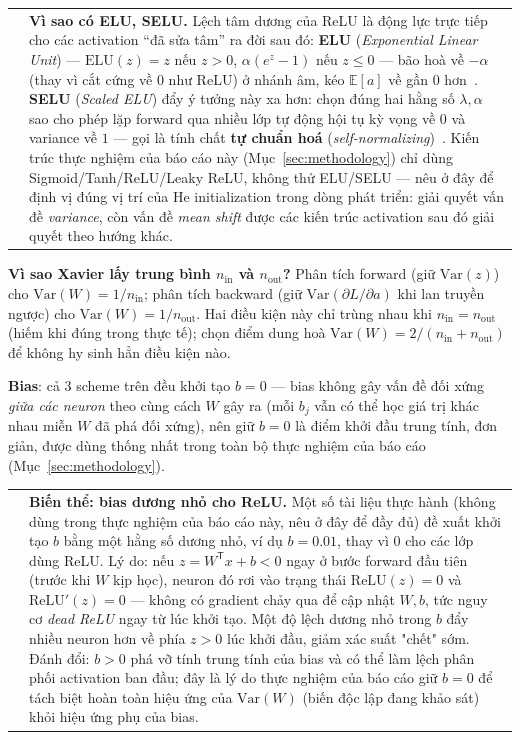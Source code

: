 \documentclass[12pt,a4paper]{article}
\makeatletter
\newenvironment{tructiep}[1][Cách hiểu đơn giản]
  {\par\smallskip\noindent\begin{tabular}{@{}p{0.35em}@{\hspace{6pt}}p{\dimexpr\linewidth-1.9em\relax}@{}}
   \textcolor{boxln}{\rule{2pt}{\baselineskip}} & \textbf{#1.}\enspace\ignorespaces}
  {\end{tabular}\par\smallskip}
\newcommand{\en}[1]{\textit{#1}}
\newcommand{\T}{^{\mathsf{T}}}
\makeatother
\begin{document}
\begin{tructiep}[Vì sao có ELU, SELU]
Lệch tâm dương của ReLU là động lực trực tiếp cho các activation ``đã sửa
tâm'' ra đời sau đó: \textbf{ELU} (\en{Exponential Linear Unit})
--- $\mathrm{ELU}(z)=z$ nếu $z>0$, $\alpha(e^z-1)$ nếu $z\le0$
--- bão hoà về $-\alpha$ (thay vì cắt cứng về $0$ như ReLU) ở nhánh âm,
kéo $\mathbb E[a]$ về gần $0$ hơn~\citep{clevert2016elu}. \textbf{SELU}
(\en{Scaled ELU}) đẩy ý tưởng này xa hơn: chọn đúng hai hằng số
$\lambda,\alpha$ sao cho phép lặp forward qua nhiều lớp tự động hội tụ
kỳ vọng về $0$ và variance về $1$ --- gọi là tính chất
\textbf{tự chuẩn hoá} (\en{self-normalizing})~\citep{klambauer2017selu}.
Kiến trúc thực nghiệm của báo cáo này (Mục~\ref{sec:methodology}) chỉ
dùng Sigmoid/Tanh/ReLU/Leaky ReLU, không thử ELU/SELU --- nêu ở đây để
định vị đúng vị trí của He initialization trong dòng phát triển: giải
quyết vấn đề \emph{variance}, còn vấn đề \emph{mean shift} được các kiến
trúc activation sau đó giải quyết theo hướng khác.
\end{tructiep}

\textbf{Vì sao Xavier lấy trung bình $n_{\text{in}}$ và $n_{\text{out}}$?}
Phân tích forward (giữ $\mathrm{Var}(z)$) cho $\mathrm{Var}(W)=1/n_{\text{in}}$;
phân tích backward (giữ $\mathrm{Var}(\partial L/\partial a)$ khi lan
truyền ngược) cho $\mathrm{Var}(W)=1/n_{\text{out}}$. Hai điều kiện này chỉ
trùng nhau khi $n_{\text{in}}=n_{\text{out}}$ (hiếm khi đúng trong thực
tế); \citet{glorot2010understanding} chọn điểm dung hoà
$\mathrm{Var}(W)=2/(n_{\text{in}}+n_{\text{out}})$ để không hy sinh hẳn
điều kiện nào.

\textbf{Bias}: cả 3 scheme trên đều khởi tạo $b=0$ --- bias không gây vấn
đề đối xứng \emph{giữa các neuron} theo cùng cách $W$ gây ra (mỗi $b_j$
vẫn có thể học giá trị khác nhau miễn $W$ đã phá đối xứng), nên giữ $b=0$
là điểm khởi đầu trung tính, đơn giản, được dùng thống nhất trong toàn bộ
thực nghiệm của báo cáo (Mục~\ref{sec:methodology}).

\begin{tructiep}[Biến thể: bias dương nhỏ cho ReLU]
Một số tài liệu thực hành (không dùng trong thực nghiệm của báo cáo này,
nêu ở đây để đầy đủ) đề xuất khởi tạo $b$ bằng một hằng số dương nhỏ, ví
dụ $b=0.01$, thay vì $0$ cho các lớp dùng ReLU. Lý do: nếu $z=W\T x+b<0$
ngay ở bước forward đầu tiên (trước khi $W$ kịp học), neuron đó rơi vào
trạng thái $\mathrm{ReLU}(z)=0$ và $\mathrm{ReLU}'(z)=0$ --- không có
gradient chảy qua để cập nhật $W,b$, tức nguy cơ \emph{dead ReLU} ngay từ
lúc khởi tạo. Một độ lệch dương nhỏ trong $b$ đẩy nhiều neuron hơn về phía
$z>0$ lúc khởi đầu, giảm xác suất "chết" sớm. Đánh đổi: $b>0$ phá vỡ tính
trung tính của bias và có thể làm lệch phân phối activation ban đầu; đây
là lý do thực nghiệm của báo cáo giữ $b=0$ để tách biệt hoàn toàn hiệu ứng
của $\mathrm{Var}(W)$ (biến độc lập đang khảo sát) khỏi hiệu ứng phụ của
bias.
\end{tructiep}
\end{document}

